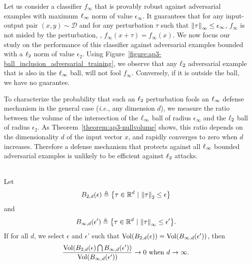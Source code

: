 Let us consider a classifier $f_{\infty}$ that is provably robust against adversarial examples with maximum $\ell_\infty $ norm of value $\epsilon_\infty$.
It guarantees that for any input-output pair $(x,y) \sim \mathcal D$ and for any perturbation $\tau$ such that $\norm{\tau}_\infty \leq \epsilon_\infty$, $f_{\infty}$ is not misled by the perturbation, \ie, $f_{\infty}(x + \tau) = f_{\infty}(x)$.
We now focus our study on the performance of this classifier against adversarial examples bounded with a $\ell_2 $ norm of value $\epsilon_2$.
Using Figure~\ref{figure:ap3-ball_inclusion_adversarial_training}, we observe that any $\ell_2 $ adversarial example that is also in the $\ell_\infty $ ball, will not fool $f_{\infty}$.
Conversely, if it is outside the ball, we have no guarantee.

To characterize the probability that such an  $\ell_2 $ perturbation fools an $\ell_\infty $ defense mechanism in the general case (\emph{i.e.}, any dimension $d$), we measure the ratio between the volume of the intersection of the $\ell_\infty $ ball of radius $\epsilon_\infty$ and the $\ell_2 $ ball of radius $\epsilon_2$. As Theorem~\ref{theorem:ap3-nullvolume} shows, this ratio depends on the dimensionality $d$ of the input vector $x$, and  rapidly converges to zero when $d$ increases. 
Therefore a defense mechanism that protects against all $\ell_\infty $ bounded adversarial examples is unlikely to be efficient against $\ell_2 $ attacks.


\begin{theorem} ~\\
Let
\begin{equation}
  B_{2,d}(\epsilon) \triangleq \left \{\tau \in \Rbb^d \ |\  \norm{\tau}_2 \leq \epsilon \right \}
\end{equation}
and
\begin{equation}
  B_{\infty,d}(\epsilon') \triangleq \left \{\tau \in \Rbb^d \ |\  \norm{\tau}_\infty \leq \epsilon' \right\}.
\end{equation}
If for all $d$, we select $\epsilon$ and $\epsilon$' such that $\Vol\left(B_{2,d}(\epsilon)\right) = \Vol\left(B_{\infty,d}(\epsilon')\right)$, then
\begin{equation}
  \frac{\Vol\left(B_{2,d}(\epsilon)\bigcap B_{\infty,d}(\epsilon')\right)}{\Vol\left(B_{\infty,d}(\epsilon')\right)} \rightarrow 0 \text{ when } d\rightarrow \infty.
\end{equation}
\label{theorem:ap3-nullvolume}
\end{theorem} 

